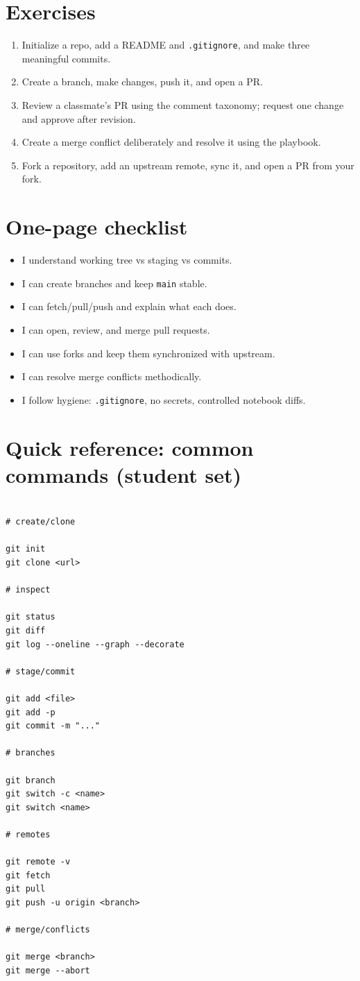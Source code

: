 \section{Exercises}
\begin{enumerate}
\item Initialize a repo, add a README and \texttt{.gitignore}, and make three meaningful commits.
\item Create a branch, make changes, push it, and open a PR.
\item Review a classmate's PR using the comment taxonomy; request one change and approve after revision.
\item Create a merge conflict deliberately and resolve it using the playbook.
\item Fork a repository, add an upstream remote, sync it, and open a PR from your fork.
\end{enumerate}

\section{One-page checklist}
\begin{itemize}
\item I understand working tree vs staging vs commits.
\item I can create branches and keep \texttt{main} stable.
\item I can fetch/pull/push and explain what each does.
\item I can open, review, and merge pull requests.
\item I can use forks and keep them synchronized with upstream.
\item I can resolve merge conflicts methodically.
\item I follow hygiene: \texttt{.gitignore}, no secrets, controlled notebook diffs.
\end{itemize}

\section{Quick reference: common commands (student set)}
\begin{verbatim}

# create/clone

git init
git clone <url>

# inspect

git status
git diff
git log --oneline --graph --decorate

# stage/commit

git add <file>
git add -p
git commit -m "..."

# branches

git branch
git switch -c <name>
git switch <name>

# remotes

git remote -v
git fetch
git pull
git push -u origin <branch>

# merge/conflicts

git merge <branch>
git merge --abort
\end{verbatim}
